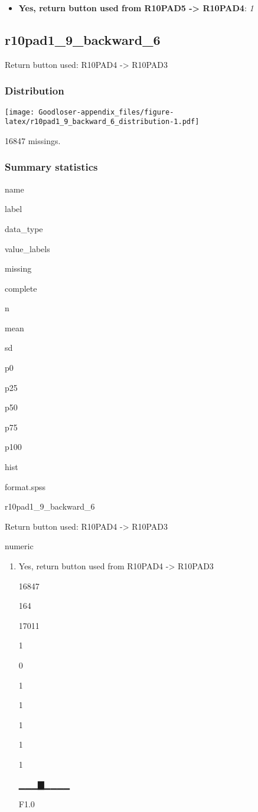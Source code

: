 \documentclass[]{book}
\providecommand{\tightlist}{%
  \setlength{\itemsep}{0pt}\setlength{\parskip}{0pt}}
\begin{document}
\begin{itemize}
\tightlist
\item
  \textbf{Yes, return button used from R10PAD5 -\textgreater{} R10PAD4}:
  \emph{1}
\end{itemize}

\subsection{r10pad1\_9\_backward\_6}\label{r10pad1_9_backward_6}

Return button used: R10PAD4 -\textgreater{} R10PAD3

\subsubsection{Distribution}\label{r10pad1_9_backward_6_distribution}

\texttt{[image: Goodloser-appendix\_files/figure-latex/r10pad1\_9\_backward\_6\_distribution-1.pdf]}

16847 missings.

\subsubsection{Summary statistics}\label{r10pad1_9_backward_6_summary}

name

label

data\_type

value\_labels

missing

complete

n

mean

sd

p0

p25

p50

p75

p100

hist

format.spss

r10pad1\_9\_backward\_6

Return button used: R10PAD4 -\textgreater{} R10PAD3

numeric

\begin{enumerate}
\def\labelenumi{\arabic{enumi}.}
\tightlist
\item
  Yes, return button used from R10PAD4 -\textgreater{} R10PAD3

  16847

  164

  17011

  1

  0

  1

  1

  1

  1

  1

  ▁▁▁▇▁▁▁▁

  F1.0
\end{enumerate}
\end{document}
